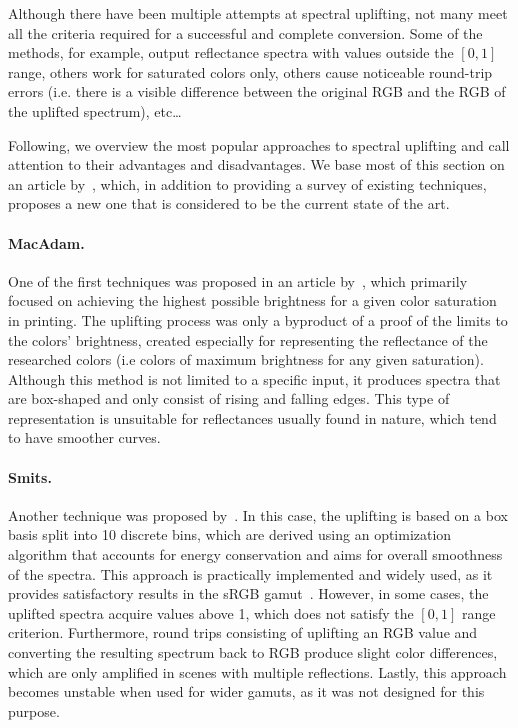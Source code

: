 Although there have been multiple attempts at spectral uplifting, not many meet all the criteria required for a successful and complete conversion. Some of the methods, for example, output reflectance spectra with values outside the $[0,1]$ range, others work for saturated colors only, others cause noticeable round-trip errors (i.e. there is a visible difference between the original RGB and the RGB of the uplifted spectrum), etc\ldots

Following, we overview the most popular approaches to spectral uplifting and call attention to their advantages and disadvantages. We base most of this section on an article by~\citet{upsamplingFluorescence}, which, in addition to providing a survey of existing techniques, proposes a new one that is considered to be the current state of the art.

\paragraph{MacAdam.} One of the first techniques was proposed in an article by~\citet{upsamplingMacAdam}, which primarily focused on achieving the highest possible brightness for a given color saturation in printing. The uplifting process was only a byproduct of a proof of the limits to the colors' brightness, created especially for representing the reflectance of the researched colors (i.e colors of maximum brightness for any given saturation). Although this method is not limited to a specific input, it produces spectra that are box-shaped and only consist of rising and falling edges. This type of representation is unsuitable for reflectances usually found in nature, which tend to have smoother curves.

\paragraph{Smits.} Another technique was proposed by~\citet{upsamplingSmits}. In this case, the uplifting is based on a box basis split into 10 discrete bins, which are derived using an optimization algorithm that accounts for energy conservation and aims for overall smoothness of the spectra. This approach is practically implemented and widely used, as it provides satisfactory results in the sRGB gamut~\cite{upsamplingJakobHanika}. However, in some cases, the uplifted spectra acquire values above 1, which does not satisfy the $[0,1]$ range criterion. Furthermore, round trips consisting of uplifting an RGB value and converting the resulting spectrum back to RGB produce slight color differences, which are only amplified in scenes with multiple reflections. Lastly, this approach becomes unstable when used for wider gamuts, as it was not designed for this purpose.

